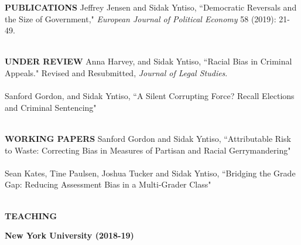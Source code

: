 \documentclass[letterpaper,11pt,oneside]{article}
\begin{document}
	\noindent\textbf{\textsc{PUBLICATIONS}
		\vspace{2mm}}
	\newline
	\noindent
	\hangindent=0.7cm {
		Jeffrey Jensen and Sidak Yntiso,  ``Democratic Reversals and the Size of Government,"  \textit{European Journal of Political Economy} 58 (2019): 21-49. \\ \\
	}
	
	\noindent\textbf{\textsc{UNDER REVIEW}
		\vspace{2mm}}
	\newline
	\noindent
	\hangindent=0.7cm {
		Anna Harvey, and Sidak Yntiso, {``Racial Bias in Criminal Appeals." Revised and Resubmitted, \textit{Journal of Legal Studies}.} \\ \\
	}
	\hangindent=0.7cm {
		Sanford Gordon, and Sidak Yntiso, {``A Silent Corrupting Force? Recall Elections and Criminal Sentencing"} \\ \\
	}
	
	\noindent\textbf{\textsc{WORKING PAPERS}
		\vspace{2mm}}
	\newline
	\noindent
	\hangindent=0.7cm {
		Sanford Gordon and Sidak Yntiso, {``Attributable Risk to Waste: Correcting Bias in Measures of Partisan and Racial Gerrymandering"} \\ \\	
	}
	\hangindent=0.7cm {
		Sean Kates, Tine Paulsen, Joshua Tucker and Sidak Yntiso, {``Bridging the Grade Gap: Reducing Assessment Bias in a Multi-Grader Class"} \\ \\
	}
	
	
	
	\bigskip
	\noindent\textbf{\textsc{TEACHING}
		\vspace{-2mm}}
	\newline
	\noindent
	
	\textbf{New York University (2018-19)}\\
	\noindent
	
\end{document}
